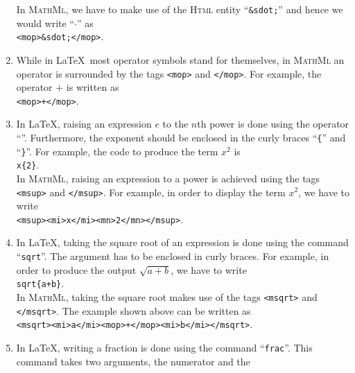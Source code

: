 \begin{enumerate}
      In \textsc{MathMl}, we have to make use of the \textsc{Html} entity ``\texttt{\&sdot;}'' and
      hence we would write ``$\cdot$'' as
      \\[0.2cm]
      \hspace*{1.3cm}
      \texttt{<mop>\&sdot;</mop>}.
\item While in \LaTeX\ most operator symbols stand for themselves, in \textsc{MathMl}
      an operator is surrounded by the tags 
      \texttt{<mop>} and \texttt{</mop>}.  For example, the operator $+$ is written as    
      \\[0.2cm]
      \hspace*{1.3cm}
      \texttt{<mop>+</mop>}.
\item In \LaTeX, raising an expression $e$ to the $n$th power is done using the operator
      ``\texttt{}''.  Furthermore, the exponent should be enclosed in the curly braces
      ``\texttt{\{}'' and ``\texttt{\}}''.  For example, the code to produce the term $x^2$ is
      \\[0.2cm]
      \hspace*{1.3cm}
      \texttt{x\{2\}}.
      \\[0.2cm]
      In \textsc{MathMl}, raising an expression to a power is achieved using the tags
      \texttt{<msup>} and \texttt{</msup>}.  For example, in order to display the term $x^2$, we
      have to write  
      \\[0.2cm]
      \hspace*{1.3cm}
      \texttt{<msup><mi>x</mi><mn>2</mn></msup>}.
\item In \LaTeX, taking the square root of an expression is done using the command
      ``\texttt{sqrt}''.  The argument has to be enclosed in curly braces.
      For example, in order to produce the output $\sqrt{a+b}$, we have to write
      \\[0.2cm]
      \hspace*{1.3cm}
      \texttt{sqrt\{a+b\}}.
      \\[0.2cm]
      In \textsc{MathMl}, taking the square root makes use of the tags \texttt{<msqrt>} 
      and \texttt{</msqrt>}.  The example shown above can be written as
      \\[0.2cm]
      \hspace*{1.3cm}
      \texttt{<msqrt><mi>a</mi><mop>+</mop><mi>b</mi></msqrt>}.
\item In \LaTeX, writing a fraction is done using the command
      ``\texttt{frac}''.  This command takes two arguments, the numerator and the

\end{enumerate}
